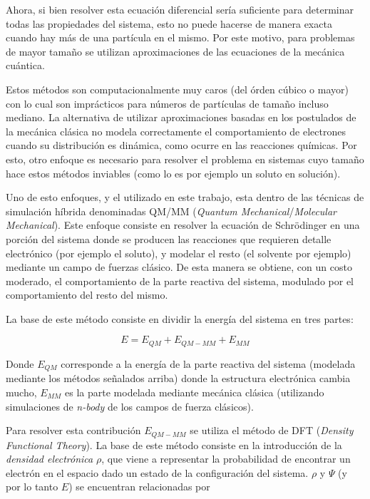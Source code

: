 Ahora, si bien resolver esta ecuaci\'on diferencial ser\'ia suficiente para determinar todas las propiedades del sistema, esto no puede hacerse de 
manera exacta cuando hay m\'as de una part\'icula en el mismo. Por este motivo, para problemas de mayor tama\~no se utilizan aproximaciones de las
ecuaciones de la mec\'anica cu\'antica.

Estos m\'etodos son computacionalmente muy caros (del \'orden c\'ubico o mayor) con lo cual son impr\'acticos para n\'umeros de part\'iculas de 
tama\~no incluso mediano. La alternativa de utilizar aproximaciones basadas en los postulados de la mec\'anica cl\'asica no modela correctamente el
comportamiento de electrones cuando su distribuci\'on es din\'amica, como ocurre en las reacciones qu\'imicas. Por esto, otro enfoque es necesario 
para resolver el problema en sistemas cuyo tama\~no hace estos m\'etodos inviables (como lo es por ejemplo un soluto en soluci\'on).

Uno de esto enfoques, y el utilizado en este trabajo, esta dentro de las t\'ecnicas de simulaci\'on h\'ibrida denominadas QM/MM 
(\textit{Quantum Mechanical}/\textit{Molecular Mechanical}). Este enfoque consiste en resolver la ecuaci\'on de
Schr\"odinger en una porci\'on del sistema donde se producen las reacciones que requieren detalle electr\'onico (por ejemplo el soluto), 
y modelar el resto (el solvente por ejemplo) mediante un campo de fuerzas cl\'asico. De esta manera se obtiene, con un costo moderado, 
el comportamiento de la parte reactiva del sistema, modulado por el comportamiento del resto del mismo.

La base de este m\'etodo consiste en dividir la energ\'ia del sistema en tres partes:

\begin{equation}
    E = E_{QM} + E_{QM-MM} + E_{MM} 
\end{equation}

Donde $E_{QM}$ corresponde a la energ\'ia de la parte reactiva del sistema (modelada mediante los m\'etodos se\~nalados arriba) donde la estructura
electr\'onica cambia mucho, $E_{MM}$ es la parte modelada mediante mec\'anica cl\'asica (utilizando simulaciones de \textit{n-body} de los campos de
fuerza cl\'asicos).

Para resolver esta contribuci\'on $E_{QM-MM}$ se utiliza el m\'etodo
de DFT (\textit{Density Functional Theory}). La base de este m\'etodo consiste en la introducci\'on de la
\textit{densidad electr\'onica} $\rho$, que viene a representar la probabilidad de encontrar un electr\'on en
el espacio dado un estado de la configuraci\'on del sistema. $\rho$ y $\Psi$ (y por lo tanto $E$) se encuentran relacionadas por

